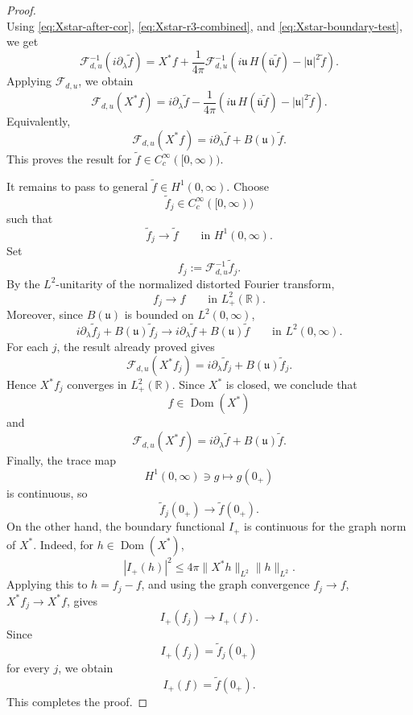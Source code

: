 \documentclass[10pt]{article}
\numberwithin{equation}{section}
\numberwithin{theorem}{section}
\begin{document}
\begin{proof}
\begin{equation}
\end{equation}
Using \eqref{eq:Xstar-after-cor}, \eqref{eq:Xstar-r3-combined}, and
\eqref{eq:Xstar-boundary-test}, we get
\[
\mathcal F_{d,u}^{-1}(i\partial_\lambda\widetilde f)
=
X^*f
+
\frac1{4\pi}
\mathcal F_{d,u}^{-1}
\left(
i\mathfrak u\,H(\overline{\mathfrak u}\widetilde f)
-
|\mathfrak u|^2\widetilde f
\right).
\]
Applying \(\mathcal F_{d,u}\), we obtain
\begin{equation}
\label{eq:Xstar-final-test}
\mathcal F_{d,u}(X^*f)
=
i\partial_\lambda\widetilde f
-
\frac1{4\pi}
\left(
i\mathfrak u\,H(\overline{\mathfrak u}\widetilde f)
-
|\mathfrak u|^2\widetilde f
\right).
\end{equation}
Equivalently,
\[
\mathcal F_{d,u}(X^*f)
=
i\partial_\lambda\widetilde f
+
B(\mathfrak u)\widetilde f.
\]
This proves the result for \(\widetilde f\in C_c^\infty([0,\infty))\).

It remains to pass to general \(\widetilde f\in H^1(0,\infty)\). Choose
\[
\widetilde f_j\in C_c^\infty([0,\infty))
\]
such that
\[
\widetilde f_j\to\widetilde f
\qquad\text{in }H^1(0,\infty).
\]
Set
\[
f_j:=\mathcal F_{d,u}^{-1}\widetilde f_j.
\]
By the \(L^2\)-unitarity of the normalized distorted Fourier transform,
\[
f_j\to f
\qquad\text{in }L^2_+(\mathbb R).
\]
Moreover, since \(B(\mathfrak u)\) is bounded on \(L^2(0,\infty)\),
\[
i\partial_\lambda\widetilde f_j+B(\mathfrak u)\widetilde f_j
\longrightarrow
i\partial_\lambda\widetilde f+B(\mathfrak u)\widetilde f
\qquad\text{in }L^2(0,\infty).
\]
For each \(j\), the result already proved gives
\[
\mathcal F_{d,u}(X^*f_j)
=
i\partial_\lambda\widetilde f_j+B(\mathfrak u)\widetilde f_j.
\]
Hence \(X^*f_j\) converges in \(L^2_+(\mathbb R)\). Since \(X^*\) is closed, we conclude
that
\[
f\in\operatorname{Dom}(X^*)
\]
and
\begin{equation}
\label{eq:Xstar-final-general}
\mathcal F_{d,u}(X^*f)
=
i\partial_\lambda\widetilde f+B(\mathfrak u)\widetilde f.
\end{equation}
Finally, the trace map
\[
H^1(0,\infty)\ni g\mapsto g(0_+)
\]
is continuous, so
\[
\widetilde f_j(0_+)\to\widetilde f(0_+).
\]
On the other hand, the boundary functional \(I_+\) is continuous for the graph norm of
\(X^*\). Indeed, for \(h\in\operatorname{Dom}(X^*)\),
\[
|I_+(h)|^2
\le
4\pi\|X^*h\|_{L^2}\|h\|_{L^2}.
\]
Applying this to \(h=f_j-f\), and using the graph convergence \(f_j\to f\),
\(X^*f_j\to X^*f\), gives
\[
I_+(f_j)\to I_+(f).
\]
Since
\[
I_+(f_j)=\widetilde f_j(0_+)
\]
for every \(j\), we obtain
\[
I_+(f)=\widetilde f(0_+).
\]
This completes the proof.
\end{proof}
\end{document}
